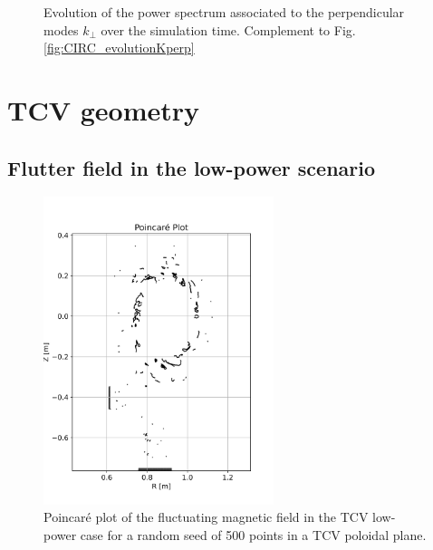 \begin{figure}[H]
\begin{subfigure}[t]{0.45\textwidth}
		\label{fig:CIRC_evolutionKperp_PHIAJ}
	\end{subfigure}
	\caption{Evolution of the power spectrum associated to the perpendicular modes $k_\perp$ over the simulation time. Complement to Fig. \ref{fig:CIRC_evolutionKperp}}
	\label{fig:CIRC_evolutionKperp_bis}
\end{figure}



\section{TCV geometry}
\label{sec:turbulentProfiles_TCV}

\subsection{Flutter field in the low-power scenario}
\label{sec:turbulentProfiles_poincareLmode}


\begin{figure}[H]\centering
	\centering
	\includegraphics[width=0.6\textwidth]{schemes/poincareTCV_Lmode.jpg}
	\caption{Poincaré plot of the fluctuating magnetic field in the TCV low-power case for a random seed of 500 points in a TCV poloidal plane.}
	\label{fig:TCV_poincareFlutter_Lmode}
\end{figure}


